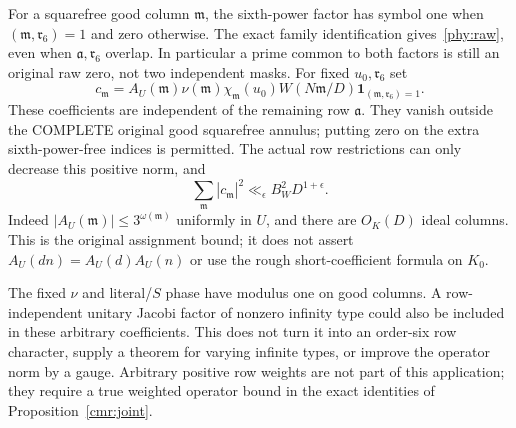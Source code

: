 \documentclass[11pt]{article}
\theoremstyle{definition}\newtheorem{definition}[theorem]{Definition}
\theoremstyle{remark}\newtheorem{remark}[theorem]{Remark}
\begin{document}
For a squarefree good column $\mathfrak m$, the sixth-power factor has
symbol one when $(\mathfrak m,\mathfrak r_6)=1$ and zero otherwise.
The exact family identification gives~\eqref{phy:raw}, even when
$\mathfrak a,\mathfrak r_6$ overlap. In particular a prime common to
both factors is still an original raw zero, not two independent masks.
For fixed $u_0,\mathfrak r_6$ set
\[
 c_{\mathfrak m}=A_U(\mathfrak m)\nu(\mathfrak m)
       \chi_{\mathfrak m}(u_0)W(N\mathfrak m/D)
                       \mathbf1_{(\mathfrak m,\mathfrak r_6)=1}.
\]
These coefficients are independent of the remaining row $\mathfrak a$.
They vanish outside the COMPLETE original good squarefree annulus;
putting zero on the extra sixth-power-free indices is permitted.
The actual row restrictions can only decrease this positive norm, and
\begin{equation}\label{phy:coefficient-norm}
 \sum_{\mathfrak m}|c_{\mathfrak m}|^2
       \ll_\epsilon B_W^2D^{1+\epsilon}.
\end{equation}
Indeed $|A_U(\mathfrak m)|\le3^{\omega(\mathfrak m)}$
uniformly in $U$, and there are $O_K(D)$ ideal columns. This is the
original assignment bound; it does not assert
$A_U(dn)=A_U(d)A_U(n)$ or use the rough short-coefficient formula on $K_0$.

The fixed $\nu$ and literal/$S$ phase have modulus one on good columns.
A row-independent unitary Jacobi factor of nonzero infinity type could
also be included in these arbitrary coefficients. This does not turn it
into an order-six row character, supply a theorem for varying infinite
types, or improve the operator norm by a gauge. Arbitrary positive row
weights are not part of this application; they require a true weighted
operator bound in the exact identities of Proposition~\ref{cmr:joint}.
\end{document}
